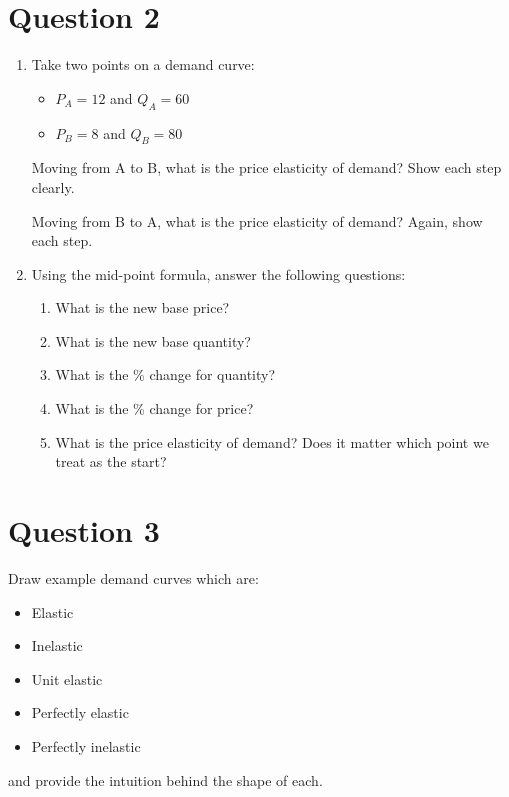 \documentclass[12pt]{article}
\begin{document}
\section*{Question 2}
\begin{enumerate}
\item Take two points on a demand curve:
\begin{itemize}
    \item $P_A=12$ and $Q_A=60$
    \item $P_B=8$ and $Q_B=80$
\end{itemize}

Moving from A to B, what is the price elasticity of demand? Show each step clearly.

\vspace{2mm}

Moving from B to A, what is the price elasticity of demand? Again, show each step.

\vspace{5mm}

\item Using the mid-point formula, answer the following questions:
\begin{enumerate}
    \item What is the new base price?
    \item What is the new base quantity?
    \item What is the \% change for quantity?
    \item What is the \% change for price?
    \item What is the price elasticity of demand? Does it matter which point we treat as the start?
\end{enumerate}
\end{enumerate}

\section*{Question 3}
Draw example demand curves which are:
\begin{itemize}
 \item Elastic
 \item Inelastic
 \item Unit elastic
 \item Perfectly elastic
 \item Perfectly inelastic
\end{itemize}
and provide the intuition behind the shape of each.

\vspace{2mm}
\end{document}
